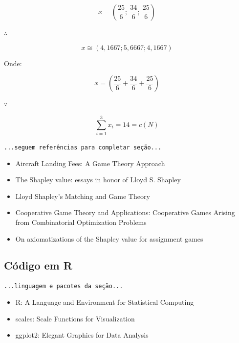 \documentclass[
	article,			        %
	11pt,				          %
	oneside,			        %
	a4paper,			        %
	english,			        %
	brazil,				        %
	sumario=tradicional
]{abntex2}\usepackage[]{graphicx}\usepackage[]{color}
\begin{document}
\begin{equation}
 \label{eq:shaValXSol}
  x = \left ( 
        \frac{25}{6}; \
        \frac{34}{6}; \
        \frac{25}{6}
      \right ) 
\end{equation}

$\therefore$

\begin{equation}
 \label{eq:shaValXSolApx}
  x \cong \left (4,1667; 5,6667; 4,1667 \right ) 
\end{equation}

Onde:

\begin{equation}
 \label{eq:shaValXProva}
  x = \left ( 
        \frac{25}{6} +
        \frac{34}{6} +
        \frac{25}{6}
      \right )
\end{equation}

$\because$

\begin{equation}
 \label{eq:shaValXPorque}
 \sum_{i = 1}^{3}x_i = 14 = c(N)
\end{equation}

\texttt{\color{red}...seguem referências para completar seção...}
  
  \begin{itemize}
    \item Aircraft Landing Fees: A Game Theory Approach \cite{Littlechild.1977}
    \item The Shapley value: essays in honor of Lloyd S. Shapley \cite{Alvin.1988}
    \item Lloyd Shapley's Matching and Game Theory \cite{Serrano.2013}
    \item Cooperative Game Theory and Applications: Cooperative Games Arising from Combinatorial Optimization Problems \cite{Curiel.2013}
    \item On axiomatizations of the Shapley value for assignment games \cite{Brink.2015}
  \end{itemize}

\subsection{Código em R}

  \texttt{\color{red}...linguagem e pacotes da seção...}

  \begin{itemize}
    \item R: A Language and Environment for Statistical Computing \cite{R.2016}
    \item scales: Scale Functions for Visualization \cite{Wickham.2015}
    \item ggplot2: Elegant Graphics for Data Analysis \cite{Wickham.2009}
  \end{itemize}
\end{document}
